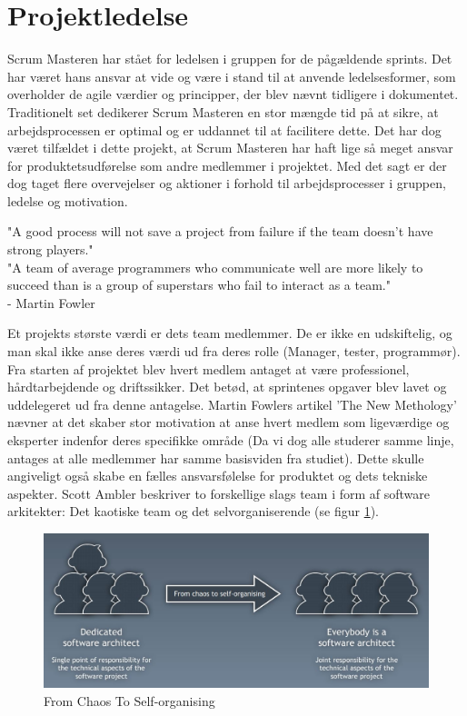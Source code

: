 \documentclass[a4paper,12pt,fleqn,oneside]{article}
\begin{document}
\section{Projektledelse}
Scrum Masteren har stået for ledelsen i gruppen for de pågældende sprints. Det har været hans ansvar at vide og være i stand til at anvende ledelsesformer, som overholder de agile værdier og principper, der blev nævnt tidligere i dokumentet. Traditionelt set dedikerer Scrum Masteren en stor mængde tid på at sikre, at arbejdsprocessen er optimal og er uddannet til at facilitere dette. Det har dog været tilfældet i dette projekt, at Scrum Masteren har haft lige så meget ansvar for produktetsudførelse som andre medlemmer i projektet. Med det sagt er der dog taget flere overvejelser og aktioner i forhold til arbejdsprocesser i gruppen, ledelse og motivation. 
\begin{displayquote}
"A good process will not save a project from failure if the team doesn’t
have strong players." \\
"A team of average programmers who communicate well are more
likely to succeed than is a group of superstars who fail to interact as
a team."\\ - Martin Fowler
\end{displayquote}
Et projekts største værdi er dets team medlemmer. De er ikke en udskiftelig, og man skal ikke anse deres værdi ud fra deres rolle (Manager, tester, programmør). Fra starten af projektet blev hvert medlem antaget at være professionel, hårdtarbejdende og driftssikker. Det betød, at sprintenes opgaver blev lavet og uddelegeret ud fra denne antagelse. Martin Fowlers artikel 'The New Methology' nævner at det skaber stor motivation at anse hvert medlem som ligeværdige og eksperter indenfor deres specifikke område (Da vi dog alle studerer samme linje, antages at alle medlemmer har samme basisviden fra studiet). Dette skulle angiveligt også skabe en fælles ansvarsfølelse for produktet og dets tekniske aspekter. Scott Ambler beskriver to forskellige slags team i form af software arkitekter: Det kaotiske team og det 
selvorganiserende (se figur \ref{fig:selfChaos}). 
\begin{figure}[H]
    \centering
    \includegraphics[width=\textwidth]{ProcesDokument/graphics/procesChaos.jpg}
    \caption{From Chaos To Self-organising}
    \label{fig:selfChaos}
\end{figure}
\end{document}
